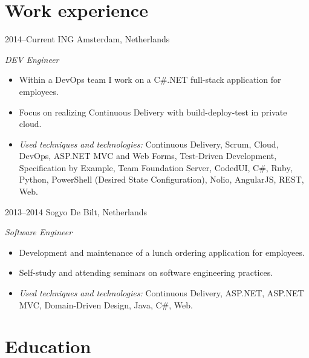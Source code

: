 \documentclass[]{friggeri-cv} %
\begin{document}

\section{Work experience}

\begin{entrylist}
\entry
{2014--Current}
{ING}
{Amsterdam, Netherlands}
{\emph{DEV Engineer}
\begin{itemize}
\item Within a DevOps team I work on a C\#.NET full-stack application for employees.
\item Focus on realizing Continuous Delivery with build-deploy-test in private cloud.
\item \emph{Used techniques and technologies:} Continuous Delivery, Scrum, Cloud,
\mbox{DevOps}, ASP.NET MVC and Web Forms, Test-Driven Development,
\mbox{Specification} by \mbox{Example}, Team Foundation Server, CodedUI, C\#, Ruby, Python, PowerShell (Desired State \mbox{Configuration}), Nolio, AngularJS, REST, Web.
\end{itemize}}
\entry
{2013--2014}
{Sogyo}
{De Bilt, Netherlands}
{\emph{Software Engineer}
\begin{itemize}
\item Development and maintenance of a lunch ordering application for employees.
\item Self-study and attending seminars on software engineering practices.
\item \emph{Used techniques and technologies:} Continuous Delivery, ASP.NET, ASP.NET MVC, Domain-Driven Design, Java, C\#, Web.
\end{itemize}}
\end{entrylist}



\section{Education}
\end{document}

